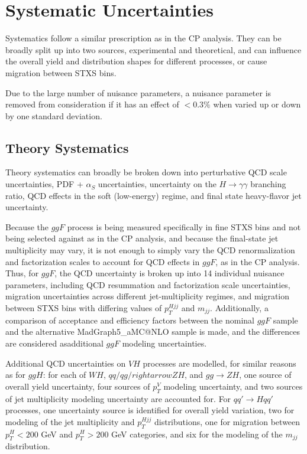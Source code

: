 \section{Systematic Uncertainties} \label{sec:Systematics} 

Systematics follow a similar prescription as in the CP analysis. They can be broadly split up into two sources, experimental and theoretical, and can influence the overall yield and distribution shapes for different processes, or cause migration between STXS bins. 

Due to the large number of nuisance parameters, a nuisance parameter is removed from consideration if it has an effect of $< 0.3\%$ when varied up or down by one standard deviation.

\subsection{Theory Systematics} \label{subsec:Theorysysts}

Theory systematics can broadly be broken down into perturbative QCD scale uncertainties, PDF + $\alpha_{S}$ uncertainties, uncertainty on the $H \rightarrow \gamma \gamma$ branching ratio, QCD effects in the soft (low-energy) regime, and final state heavy-flavor jet uncertainty.

Because the $ggF$ process is being measured specifically in fine STXS bins and not being selected against as in the CP analysis, and because the final-state jet multiplicity may vary, it is not enough to simply vary the QCD renormalization and factorization scales to account for QCD effects in $ggF$, as in the CP analysis. Thus, for $ggF$, the QCD uncertainty is broken up into 14 individual nuisance parameters, including QCD resummation and factorization scale uncertainties, migration uncertainties across different jet-multiplicity regimes, and migration between STXS bins with differing values of $p_{T}^{Hjj}$ and $m_{jj}$. Additionally, a comparison of acceptance and efficiency factors between the nominal $ggF$ sample and the alternative MadGraph5\_aMC@NLO sample is made, and the differences are considered asadditional $ggF$ modeling uncertainties.

Additional QCD uncertainties on $VH$ processes are modelled, for similar reasons as for $ggH$: for each of $WH$, $qq/qg /rightarrow ZH$, and $gg \rightarrow ZH$, one source of overall yield uncertainty, four sources of $p_{T}^{V}$ modeling uncertainty, and two sources of jet multiplicity modeling uncertainty are accounted for. For $qq' \rightarrow H qq'$ processes, one uncertainty source is identified for overall yield variation, two for modeling of the jet multiplicity and $p_{T}^{Hjj}$ distributions, one for migration between $p_{T}^{H} < 200$ GeV and $p_{T}^{H} > 200$ GeV categories, and six for the modeling of the $m_{jj}$ distribution.

